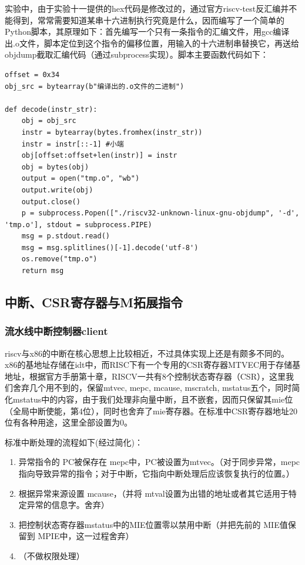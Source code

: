 \documentclass[]{article}
\begin{document}
  实验中，由于实验十一提供的hex代码是修改过的，通过官方riscv-test反汇编并不能得到，常常需要知道某串十六进制执行究竟是什么，因而编写了一个简单的Python脚本，其原理如下：首先编写一个只有一条指令的汇编文件，用gcc编译出.o文件，脚本定位到这个指令的偏移位置，用输入的十六进制串替换它，再送给objdump截取汇编代码（通过subprocess实现）。脚本主要函数代码如下：
  \begin{lstlisting}[style=python-style]
offset = 0x34
obj_src = bytearray(b"编译出的.o文件的二进制")

def decode(instr_str):
    obj = obj_src
    instr = bytearray(bytes.fromhex(instr_str))
    instr = instr[::-1] #小端
    obj[offset:offset+len(instr)] = instr
    obj = bytes(obj)
    output = open("tmp.o", "wb")
    output.write(obj)
    output.close()
    p = subprocess.Popen(["./riscv32-unknown-linux-gnu-objdump", '-d', 'tmp.o'], stdout = subprocess.PIPE)
    msg = p.stdout.read()
    msg = msg.splitlines()[-1].decode('utf-8')
    os.remove("tmp.o")
    return msg
  \end{lstlisting}
  \subsection{中断、CSR寄存器与M拓展指令}
  \subsubsection{流水线中断控制器client}
  riscv与x86的中断在核心思想上比较相近，不过具体实现上还是有颇多不同的。x86的基地址存储在idt中，而RISC下有一个专用的CSR寄存器MTVEC用于存储基地址，根据官方手册第十章，RISCV一共有8个控制状态寄存器（CSR），这里我们舍弃几个用不到的，保留mtvec, mepc, mcause, mscratch, mstatus五个，同时简化mstatus中的内容，由于我们处理非向量中断，且不嵌套，因而只保留其mie位（全局中断使能，第4位），同时也舍弃了mie寄存器。在标准中CSR寄存器地址20位有各种用途，这里全部设置为0。
  
  标准中断处理的流程如下(经过简化)：
  \begin{enumerate}
      \item 异常指令的 PC被保存在 mepc中，PC被设置为mtvec。（对于同步异常，mepc指向导致异常的指令；对于中断，它指向中断处理后应该恢复执行的位置。）
      \item 根据异常来源设置 mcause，（并将 mtval设置为出错的地址或者其它适用于特定异常的信息字。舍弃）
      \item 把控制状态寄存器mstatus中的MIE位置零以禁用中断（并把先前的 MIE值保留到 MPIE中，这一过程舍弃）
      \item （不做权限处理）
  \end{enumerate}
  
\end{document}
